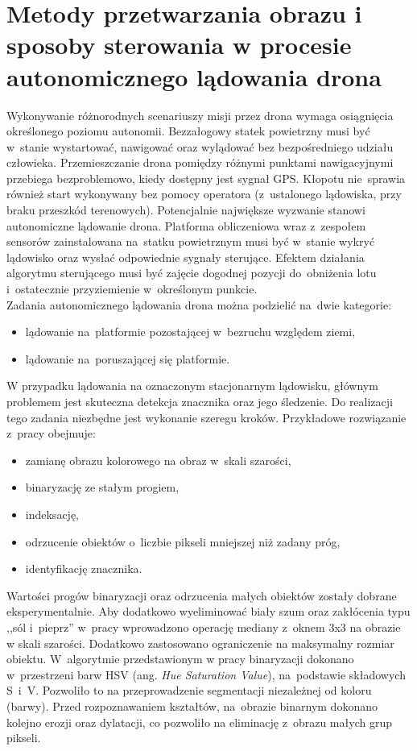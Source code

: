 \chapter{Metody przetwarzania obrazu i sposoby sterowania w procesie autonomicznego lądowania drona}
\label{cha:metody}
Wykonywanie różnorodnych scenariuszy misji przez drona wymaga osiągnięcia określonego poziomu autonomii. Bezzałogowy statek powietrzny musi być w~stanie wystartować, nawigować oraz wylądować bez bezpośredniego udziału człowieka. 
Przemieszczanie drona pomiędzy różnymi punktami nawigacyjnymi przebiega bezproblemowo, kiedy dostępny jest sygnał GPS. 
Kłopotu nie~sprawia również start wykonywany bez pomocy operatora (z~ustalonego lądowiska, przy braku przeszkód terenowych). 
Potencjalnie największe wyzwanie stanowi autonomiczne lądowanie drona. 
Platforma obliczeniowa wraz z~zespołem sensorów zainstalowana na~statku powietrznym musi być w~stanie wykryć lądowisko oraz wysłać odpowiednie sygnały sterujące. 
Efektem działania algorytmu sterującego musi być zajęcie dogodnej pozycji do~obniżenia lotu i~ostatecznie przyziemienie w~określonym punkcie. \\
Zadania autonomicznego lądowania drona można podzielić na~dwie kategorie:  
\begin{itemize}
	\item lądowanie na~platformie pozostającej w~bezruchu względem ziemi,
	\item lądowanie na~poruszającej się platformie.
\end{itemize}

W przypadku lądowania na oznaczonym stacjonarnym lądowisku, głównym problemem jest skuteczna detekcja znacznika oraz jego śledzenie. 
Do realizacji tego zadania niezbędne jest wykonanie szeregu kroków.
Przykładowe rozwiązanie z~pracy \cite{Rings} obejmuje:
\begin{itemize}
	\item zamianę obrazu kolorowego na obraz w~skali szarości,
	\item binaryzację ze stałym progiem,
	\item indeksację,
	\item odrzucenie obiektów o~liczbie pikseli mniejszej niż zadany próg,
	\item identyfikację znacznika.
\end{itemize}

Wartości progów binaryzacji oraz odrzucenia małych obiektów zostały dobrane eksperymentalnie. 
Aby dodatkowo wyeliminować biały szum oraz zakłócenia typu ,,sól i~pieprz'' w~pracy \cite{H_median} wprowadzono operację mediany z~oknem 3x3 na obrazie w skali szarości. 
Dodatkowo zastosowano ograniczenie na maksymalny rozmiar obiektu. 
W~algorytmie przedstawionym w pracy \cite{FPGA} binaryzacji dokonano w~przestrzeni barw HSV (ang. \textit{Hue Saturation Value}), na~podstawie składowych S~i~V. 
Pozwoliło to na przeprowadzenie segmentacji niezależnej od koloru (barwy). 
Przed rozpoznawaniem kształtów, na~obrazie binarnym dokonano kolejno erozji oraz dylatacji, co  pozwoliło na eliminację z~obrazu małych grup pikseli. \par 

